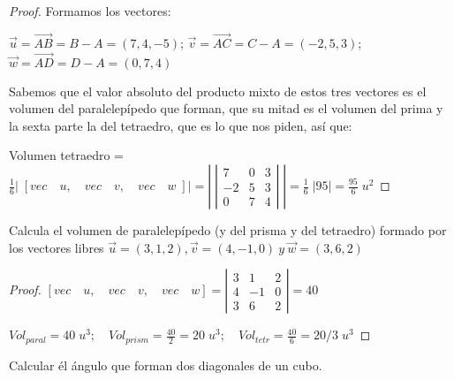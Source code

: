 \begin{proof}\renewcommand{\qedsymbol}{$\diamond$}

Formamos los vectores:

$\vec u = \overrightarrow {AB}=B-A=(7,4,-5)$; 
$\vec v = \overrightarrow {AC}=C-A=(-2,5,3)$; 
$\vec w = \overrightarrow {AD}=D-A=(0,7,4)$

Sabemos que el valor absoluto del producto mixto de estos tres vectores es el volumen del paralelepípedo que forman, que su mitad es el volumen del prima y la sexta parte la del tetraedro, que es lo que nos piden, así que: 

Volumen tetraedro = $\frac 1 6 \left|\;  \left[ vec\quad u,\quad vec\quad v,\quad vec\quad w \; \right] \right|  =\left| \;  \left| \begin{matrix} 7 & 0 & 3 \\ -2 & 5 & 3 \\ 0 & 7 & 4 \end{matrix} \right|\;  \right| =\frac 1 6 \; |95|= \frac {95}{6} \; u^2$	
\end{proof}


\begin{ejre}
	Calcula el volumen de paralelepípedo (y del prisma y del tetraedro) formado por los vectores libres $\vec u=(3,1,2), \vec v=(4,-1,0)\  y\  \vec w=(3,6,2)$
\end{ejre}

\begin{proof}\renewcommand{\qedsymbol}{$\diamond$}
	
	$\left[ vec\quad u,\quad vec\quad v,\quad vec\quad w \right] =\left| \begin{matrix} 3 & 1 & 2 \\ 4 & -1 & 0 \\ 3 & 6 & 2 \end{matrix} \right| =40$
	
	$Vol_{paral}  = 40 \;  u^3; \quad  Vol_{prism} = \frac {40}2 =20\; u^3; \quad Vol_{tetr} = \frac {40}6 = 20/3 \; u^3$
	
\end{proof}

\begin{ejre}
	Calcular él ángulo que forman dos diagonales de un cubo.
\end{ejre}

